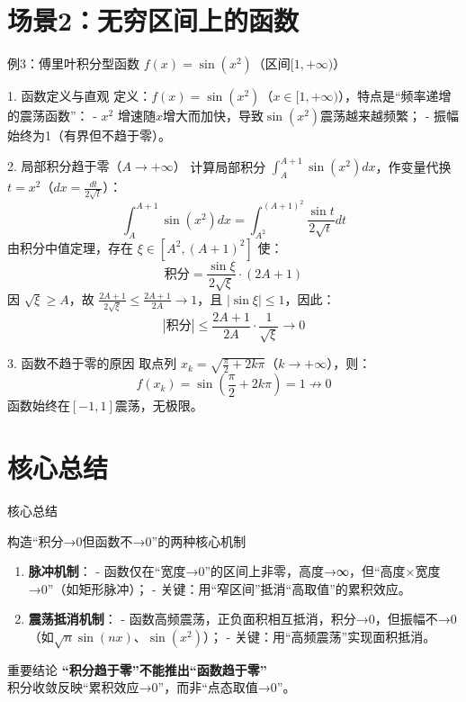 \section{场景2：无穷区间上的函数}
\begin{frame}{例3：傅里叶积分型函数 $f(x) = \sin(x^2)$（区间$[1,+\infty)$）}
  \begin{block}{1. 函数定义与直观}
    定义：$f(x) = \sin(x^2)$（$x \in [1,+\infty)$），特点是“频率递增的震荡函数”：
    - $x^2$ 增速随$x$增大而加快，导致$\sin(x^2)$震荡越来越频繁；
    - 振幅始终为1（有界但不趋于零）。
  \end{block}

  \begin{block}{2. 局部积分趋于零（$A \to +\infty$）}
    计算局部积分 $\int_A^{A+1} \sin(x^2)dx$，作变量代换 $t = x^2$（$dx = \frac{dt}{2\sqrt{t}}$）：
    \[
    \int_A^{A+1} \sin(x^2)dx = \int_{A^2}^{(A+1)^2} \frac{\sin t}{2\sqrt{t}} dt
    \]
    由积分中值定理，存在 $\xi \in [A^2, (A+1)^2]$ 使：
    \[
    \text{积分} = \frac{\sin \xi}{2\sqrt{\xi}} \cdot (2A+1)
    \]
    因 $\sqrt{\xi} \geq A$，故 $\frac{2A+1}{2\sqrt{\xi}} \leq \frac{2A+1}{2A} \to 1$，且 $|\sin \xi| \leq 1$，因此：
    \[
    |\text{积分}| \leq \frac{2A+1}{2A} \cdot \frac{1}{\sqrt{\xi}} \to 0
    \]
  \end{block}

  \begin{block}{3. 函数不趋于零的原因}
    取点列 $x_k = \sqrt{\frac{\pi}{2} + 2k\pi}$（$k \to +\infty$），则：
    \[
    f(x_k) = \sin\left(\frac{\pi}{2} + 2k\pi\right) = 1 \not\to 0
    \]
    函数始终在$[-1,1]$震荡，无极限。
  \end{block}
\end{frame}

\section{核心总结}
\begin{frame}{核心总结}
  \begin{block}{构造“积分→0但函数不→0”的两种核心机制}
    \begin{enumerate}
      \item \textbf{脉冲机制}：
        - 函数仅在“宽度→0”的区间上非零，高度→∞，但“高度×宽度→0”（如矩形脉冲）；
        - 关键：用“窄区间”抵消“高取值”的累积效应。

      \item \textbf{震荡抵消机制}：
        - 函数高频震荡，正负面积相互抵消，积分→0，但振幅不→0（如$\sqrt{n}\sin(nx)$、$\sin(x^2)$）；
        - 关键：用“高频震荡”实现面积抵消。
    \end{enumerate}
  \end{block}

  \vspace{0.5cm}
  \begin{alertblock}{重要结论}
    \centering
    \textbf{“积分趋于零”不能推出“函数趋于零”} \\
    积分收敛反映“累积效应→0”，而非“点态取值→0”。
  \end{alertblock}
\end{frame}
